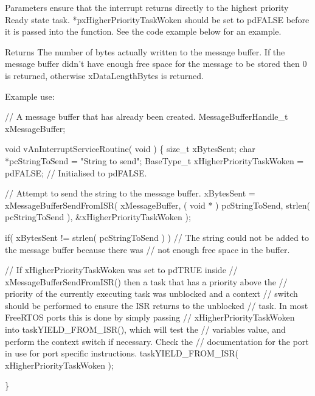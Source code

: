 \begin{DoxyPre}
\begin{DoxyPre}
\begin{DoxyParams}{Parameters}
   ensure that the interrupt returns directly to the highest priority Ready
   state task.  *pxHigherPriorityTaskWoken should be set to pdFALSE before it
   is passed into the function.  See the code example below for an example.\\
\hline
\end{DoxyParams}
\begin{DoxyReturn}{Returns}
The number of bytes actually written to the message buffer.  If the
   message buffer didn't have enough free space for the message to be stored
   then 0 is returned, otherwise xDataLengthBytes is returned.
\end{DoxyReturn}
Example use:

\begin{DoxyPre}
// A message buffer that has already been created.
MessageBufferHandle\_t xMessageBuffer;\end{DoxyPre}
\end{DoxyPre}
\end{DoxyPre}



\begin{DoxyPre}
\begin{DoxyPre}
\begin{DoxyPre}void vAnInterruptServiceRoutine( void )
\{
size\_t xBytesSent;
char *pcStringToSend = "String to send";
BaseType\_t xHigherPriorityTaskWoken = pdFALSE; // Initialised to pdFALSE.
\begin{DoxyVerb}// Attempt to send the string to the message buffer.
xBytesSent = xMessageBufferSendFromISR( xMessageBuffer,
                                        ( void * ) pcStringToSend,
                                        strlen( pcStringToSend ),
                                        &xHigherPriorityTaskWoken );

if( xBytesSent != strlen( pcStringToSend ) )
{
    // The string could not be added to the message buffer because there was
    // not enough free space in the buffer.
}

// If xHigherPriorityTaskWoken was set to pdTRUE inside
// xMessageBufferSendFromISR() then a task that has a priority above the
// priority of the currently executing task was unblocked and a context
// switch should be performed to ensure the ISR returns to the unblocked
// task.  In most FreeRTOS ports this is done by simply passing
// xHigherPriorityTaskWoken into taskYIELD_FROM_ISR(), which will test the
// variables value, and perform the context switch if necessary.  Check the
// documentation for the port in use for port specific instructions.
taskYIELD_FROM_ISR( xHigherPriorityTaskWoken );
\end{DoxyVerb}

\}
\end{DoxyPre}
 \end{DoxyPre}
\end{DoxyPre}
